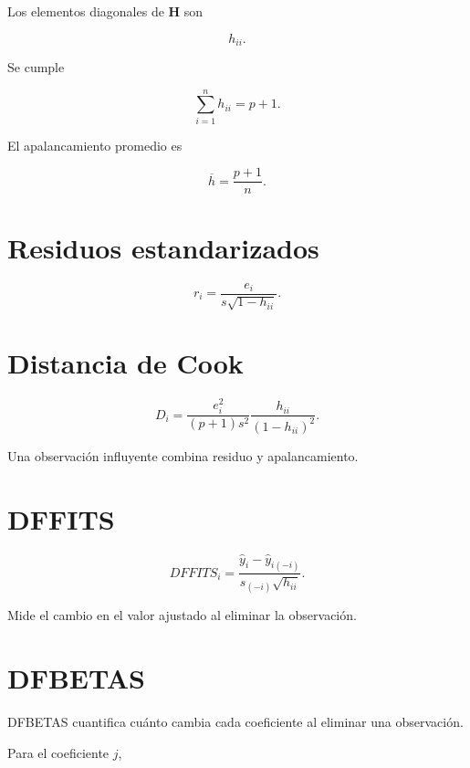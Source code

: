 \documentclass[
  spanish,
  10.5pt,
  letterpaper,
  DIV=11,
  numbers=noendperiod,
  oneside,
  open=any]{scrreprt}
\theoremstyle{definition}
\theoremstyle{definition}
\theoremstyle{plain}
\theoremstyle{remark}
\begin{document}

Los elementos diagonales de \(\mathbf{H}\) son

\[
h_{ii}.
\]

Se cumple

\[
\sum_{i=1}^{n}h_{ii}
=
p+1.
\]

El apalancamiento promedio es

\[
\overline{h}
=
\frac{
p+1
}{
n
}.
\]

\section*{Residuos estandarizados}\label{residuos-estandarizados}


\[
r_i
=
\frac{
e_i
}{
s\sqrt{1-h_{ii}}
}.
\]

\section*{Distancia de Cook}\label{distancia-de-cook}


\[
D_i
=
\frac{
e_i^2
}{
(p+1)s^2
}
\frac{
h_{ii}
}{
(1-h_{ii})^2
}.
\]

Una observación influyente combina residuo y apalancamiento.

\section*{DFFITS}\label{dffits}


\[
DFFITS_i
=
\frac{
\widehat{y}_i
-
\widehat{y}_{i(-i)}
}{
s_{(-i)}
\sqrt{h_{ii}}
}.
\]

Mide el cambio en el valor ajustado al eliminar la observación.

\section*{DFBETAS}\label{dfbetas}


DFBETAS cuantifica cuánto cambia cada coeficiente al eliminar una
observación.

Para el coeficiente \(j\),
\end{document}
